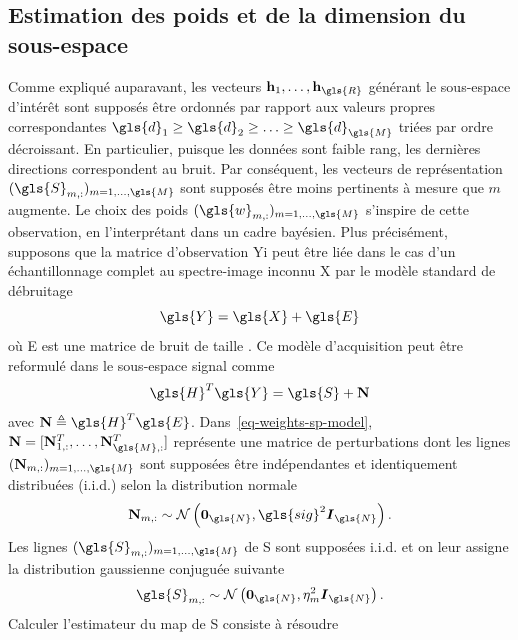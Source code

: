 \subsection{Estimation des poids et de la dimension du sous-espace}\label{subsec-3s-poids}

Comme expliqué auparavant, les vecteurs $\mathbf{h}_1,\ldots,\mathbf{h}_{\gls{R}}$ générant le sous-espace d'intérêt sont supposés être ordonnés par rapport aux valeurs propres correspondantes $\gls{d}_1\geq\gls{d}_2\geq \ldots\geq \gls{d}_{\gls{M}}$ triées par ordre décroissant. En particulier, puisque les données sont faible rang, les dernières directions correspondent au bruit. Par conséquent, les vecteurs de représentation $(\gls{S}_{m, :})_{m=1,\dots,\gls{M}}$ sont supposés être moins pertinents à mesure que $m$ augmente. Le choix des poids $(\gls{w}_{m, :})_{m=1,\dots,\gls{M}}$ s'inspire de cette observation, en l'interprétant dans un cadre bayésien.
%
Plus précisément, supposons que la matrice d'observation \gls{Yi} peut être liée dans le cas d'un échantillonnage complet au spectre-image inconnu \gls{X} par le modèle standard de débruitage
\begin{equation}
    \gls{Y} = \gls{X} + \gls{E}
\end{equation}
où \gls{E} est une matrice de bruit de taille . Ce modèle d'acquisition peut être reformulé dans le sous-espace signal comme
\begin{equation}\label{eq-weights-sp-model}
    \gls{H}^T\gls{Y} = \gls{S} + \mathbf{N}
\end{equation}
avec $\mathbf{N} \triangleq \gls{H}^T\gls{E}$. Dans~\eqref{eq-weights-sp-model}, $\mathbf{N} = [\mathbf{N}_{1, :}^T, \dots, \mathbf{N}_{\gls{M}, :}^T]$ représente une matrice de perturbations dont les lignes $(\mathbf{N}_{m, :})_{m=1,\dots,\gls{M}}$ sont supposées être indépendantes et identiquement distribuées (i.i.d.) selon la distribution normale
\begin{equation}
    \mathbf{N}_{m, :} \sim \mathcal{N}\left(\boldsymbol{0}_{\gls{N}},\gls{sig}^2 \boldsymbol{I}_{\gls{N}}\right).
\end{equation}
Les lignes $(\gls{S}_{m, :})_{m=1,\dots,\gls{M}}$ de \gls{S} sont supposées i.i.d. et on leur assigne la distribution gaussienne conjuguée suivante
\begin{equation}
    \gls{S}_{m,:} \sim \mathcal{N}\left(\boldsymbol{0}_{\gls{N}},\eta^2_{m} \boldsymbol{I}_{\gls{N}}\right).
\end{equation}
Calculer l'estimateur du \gls{map} de \gls{S} consiste à résoudre
